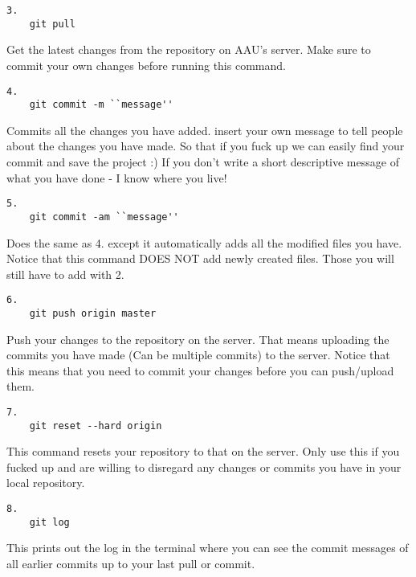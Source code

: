 \begin{verbatim}
3.
	git pull
\end{verbatim}

Get the latest changes from the repository on AAU's server. Make sure to 
commit your own changes before running this command.

\begin{verbatim}
4.
	git commit -m ``message''
\end{verbatim}

Commits all the changes you have added. insert your own message to tell people 
about the changes you have made. So that if you fuck up we can easily find 
your commit and save the project :)\n
If you don't write a short descriptive message of what you have done - I know 
where you live!

\begin{verbatim}
5.
	git commit -am ``message''
\end{verbatim}

Does the same as 4. except it automatically adds all the modified files you 
have. Notice that this command DOES NOT add newly created files. Those you 
will still have to add with 2. 

\begin{verbatim}
6.
	git push origin master
\end{verbatim}

Push your changes to the repository on the server. That means uploading the 
commits you have made (Can be multiple commits) to the server. Notice that this 
means that you need to commit your changes before you can push/upload them.

\begin{verbatim}
7.
	git reset --hard origin
\end{verbatim}

This command resets your repository to that on the server. Only use this if 
you fucked up and are willing to disregard any changes or commits you have in 
your local repository.

\begin{verbatim}
8.
	git log
\end{verbatim}

This prints out the log in the terminal where you can see the commit messages 
of all earlier commits up to your last pull or commit.
